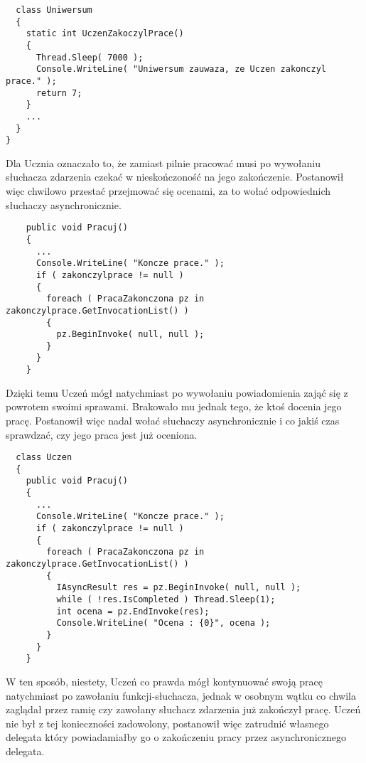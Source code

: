 {\begin{scriptsize}
\begin{verbatim}
  class Uniwersum
  {  	
    static int UczenZakoczylPrace()
    {
      Thread.Sleep( 7000 );
      Console.WriteLine( "Uniwersum zauwaza, ze Uczen zakonczyl prace." );      
      return 7;
    }
    ...
  }
}
\end{verbatim}
\end{scriptsize}

Dla Ucznia oznaczało to, że zamiast pilnie pracować musi po wywołaniu słuchacza zdarzenia czekać
w nieskończoność na jego zakończenie. Postanowił więc chwilowo przestać przejmować się ocenami, za to
wołać odpowiednich słuchaczy asynchronicznie.

\begin{scriptsize}
\begin{verbatim}
    public void Pracuj()
    {
      ...
      Console.WriteLine( "Koncze prace." );
      if ( zakonczylprace != null ) 
      {
        foreach ( PracaZakonczona pz in zakonczylprace.GetInvocationList() )      	
        {
          pz.BeginInvoke( null, null );        	
        }
      }
    }
\end{verbatim}
\end{scriptsize}

Dzięki temu Uczeń mógł natychmiast po wywołaniu powiadomienia zająć się z powrotem swoimi sprawami. 
Brakowało mu jednak tego, że ktoś docenia jego pracę. 
Postanowił więc nadal wołać słuchaczy asynchronicznie i 
co jakiś czas sprawdzać, czy jego praca jest już oceniona.

\begin{scriptsize}
\begin{verbatim}
  class Uczen
  {
    public void Pracuj()
    {
      ...   	  
      Console.WriteLine( "Koncze prace." );
      if ( zakonczylprace != null ) 
      {
        foreach ( PracaZakonczona pz in zakonczylprace.GetInvocationList() )      	
        {
          IAsyncResult res = pz.BeginInvoke( null, null );        	
          while ( !res.IsCompleted ) Thread.Sleep(1);
          int ocena = pz.EndInvoke(res);
          Console.WriteLine( "Ocena : {0}", ocena );                   	
        }
      }
    }
\end{verbatim}
\end{scriptsize}

W ten sposób, niestety, Uczeń co prawda mógł kontynuować swoją pracę natychmiast po
zawołaniu funkcji-słuchacza, jednak w osobnym wątku co chwila
zaglądał przez ramię czy zawołany słuchacz zdarzenia już zakończył pracę. Uczeń nie był z tej konieczności
zadowolony, postanowił więc zatrudnić własnego delegata który powiadamiałby go o zakończeniu pracy przez 
asynchronicznego delegata.

}
